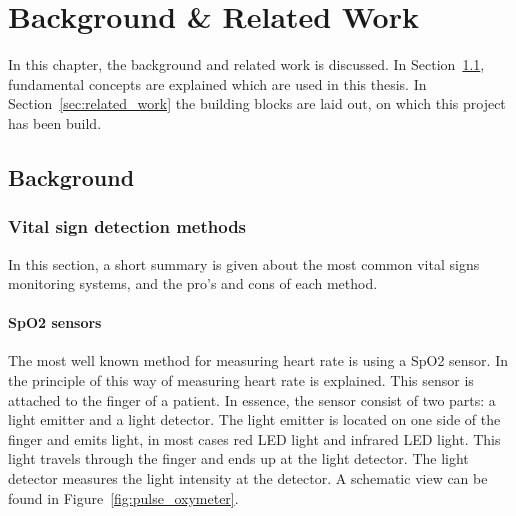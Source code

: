 \chapter{Background \& Related Work}
\label{chp:background}

In this chapter, the background and related work is discussed. In Section~\ref{sec:background}, fundamental concepts are explained which are used in this thesis. In Section~\ref{sec:related_work} the building blocks are laid out, on which this project has been build.

\section{Background}
\label{sec:background}
\subsection{Vital sign detection methods}
In this section, a short summary is given about the most common vital signs monitoring systems, and the pro's and cons of each method.


\subsubsection{SpO2 sensors}
\label{sec:spo2_sensors}
The most well known method for measuring heart rate is using a SpO2 sensor. In \cite{sinex1999pulse} the principle of this way of measuring heart rate is explained. This sensor is attached to the finger of a patient. In essence, the sensor consist of two parts: a light emitter and a light detector. The light emitter is located on one side of the finger and emits light, in most cases red LED light and infrared LED light. This light travels through the finger and ends up at the light detector. The light detector measures the light intensity at the detector. A schematic view can be found in Figure~\ref{fig:pulse_oxymeter}. 

